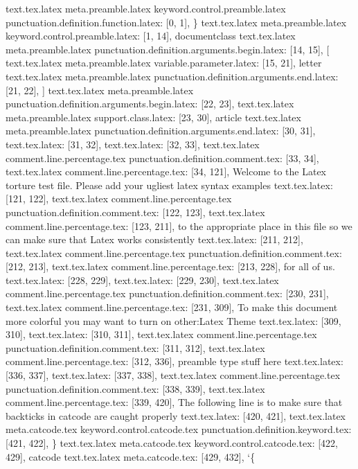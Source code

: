 text.tex.latex meta.preamble.latex keyword.control.preamble.latex punctuation.definition.function.latex: [0, 1], {\}
text.tex.latex meta.preamble.latex keyword.control.preamble.latex: [1, 14], {documentclass}
text.tex.latex meta.preamble.latex punctuation.definition.arguments.begin.latex: [14, 15], {[}
text.tex.latex meta.preamble.latex variable.parameter.latex: [15, 21], {letter}
text.tex.latex meta.preamble.latex punctuation.definition.arguments.end.latex: [21, 22], {]}
text.tex.latex meta.preamble.latex punctuation.definition.arguments.begin.latex: [22, 23], {{}
text.tex.latex meta.preamble.latex support.class.latex: [23, 30], {article}
text.tex.latex meta.preamble.latex punctuation.definition.arguments.end.latex: [30, 31], {}}
text.tex.latex: [31, 32], {
}
text.tex.latex: [32, 33], {
}
text.tex.latex comment.line.percentage.tex punctuation.definition.comment.tex: [33, 34], {%
text.tex.latex comment.line.percentage.tex: [34, 121], { Welcome to the Latex torture test file.  Please add your ugliest latex syntax examples}
text.tex.latex: [121, 122], {
}
text.tex.latex comment.line.percentage.tex punctuation.definition.comment.tex: [122, 123], {%
text.tex.latex comment.line.percentage.tex: [123, 211], { to the appropriate place in this file so we can make sure that Latex works consistently}
text.tex.latex: [211, 212], {
}
text.tex.latex comment.line.percentage.tex punctuation.definition.comment.tex: [212, 213], {%
text.tex.latex comment.line.percentage.tex: [213, 228], { for all of us.}
text.tex.latex: [228, 229], {
}
text.tex.latex: [229, 230], {
}
text.tex.latex comment.line.percentage.tex punctuation.definition.comment.tex: [230, 231], {%
text.tex.latex comment.line.percentage.tex: [231, 309], { To make this document more colorful you may want to turn on other:Latex Theme}
text.tex.latex: [309, 310], {
}
text.tex.latex: [310, 311], {
}
text.tex.latex comment.line.percentage.tex punctuation.definition.comment.tex: [311, 312], {%
text.tex.latex comment.line.percentage.tex: [312, 336], {preamble type stuff here}
text.tex.latex: [336, 337], {
}
text.tex.latex: [337, 338], {
}
text.tex.latex comment.line.percentage.tex punctuation.definition.comment.tex: [338, 339], {%
text.tex.latex comment.line.percentage.tex: [339, 420], { The following line is to make sure that backticks in catcode are caught properly}
text.tex.latex: [420, 421], {
}
text.tex.latex meta.catcode.tex keyword.control.catcode.tex punctuation.definition.keyword.tex: [421, 422], {\}
text.tex.latex meta.catcode.tex keyword.control.catcode.tex: [422, 429], {catcode}
text.tex.latex meta.catcode.tex: [429, 432], {`\{}
}}}}}}}}
